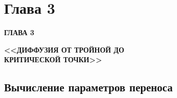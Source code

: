 \documentclass[pdf,hyperref={unicode}]{beamer}
\begin{document}
\section{Глава 3}


\begin{frame}
\begin{center}
\begin{LARGE}
\textbf{ГЛАВА 3} \\
\end{LARGE}
\vspace{5mm}
\textbf{<<ДИФФУЗИЯ ОТ ТРОЙНОЙ ДО \\ КРИТИЧЕСКОЙ ТОЧКИ>>}
\end{center}
\end{frame}


\subsection{Вычисление параметров переноса}
\end{document}
